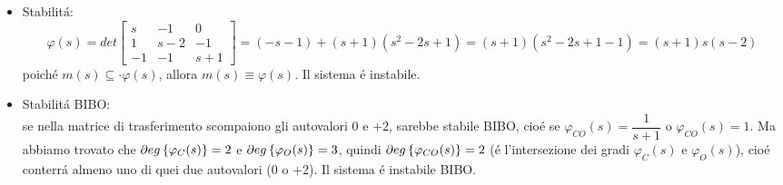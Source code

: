 \documentclass[../main.tex]{subfiles}
\begin{document}
\begin{Exercise}[title={Studiare propriet\'a di sistemi interconnessi}, difficulty=3]
\begin{enumerate}
\begin{itemize}
								Calcoliamo completamente $ Q $ per studiare l'osservabilit\'a da ogni singola uscita:
								\[
									Q=
									\begin{bmatrix}
										1 & 1 & 0\\
										0 & 1 & 0\\
										0 & 0 & 1\\
										\cline{1-3}\\
										-1 & 3 & 1\\
										-1 & 2 & 1\\
										1 & 1 & -1\\
										\cline{1-3}\\
										-2 & 6 & 2\\
										-1 & 4 & 1\\
										-2 & 2 & 2
									\end{bmatrix}
								\]
								Le prime righe di ogni sottomatrice non sono linearmente indipendenti, quindi il sistema non \'e completamente osservabile da $ y_1 $.\\
								Le seconde righe di ogni sottomatrice non sono linearmente indipendenti, quindi il sistema non \'e completamente osservabile da $ y_2 $.\\
								Le terze righe di ogni sottomatrice sono linearmente indipendenti(bisogna calcolare tutti i minori), quindi il sistema non \'e completamente osservabile da $ y_3 $.\\
							\item Stabilit\'a:
								\[
									\varphi(s) = det
									\begin{bmatrix}
										s & -1 & 0\\
										1 & s-2 & -1\\
										-1 & -1 & s+1
									\end{bmatrix} =
									(-s-1)+(s+1)(s^2-2s+1) = (s+1)(s^2-2s+1-1) =(s+1)s(s-2)
								\]
								poich\'e $ m(s) \subseteq\cdot \varphi(s) $, allora $ m(s) \equiv \varphi(s) $. Il sistema \'e instabile.
							\item Stabilit\'a BIBO:\\
								se nella matrice di trasferimento scompaiono gli autovalori $ 0 $ e $ +2 $, sarebbe stabile BIBO, cio\'e se $ \varphi_{CO}(s) = \dfrac{1}{s+1} $ o $ \varphi_{CO}(s) = 1 $. Ma abbiamo trovato che $ \partial eg \left\lbrace \varphi_C(s) \right\rbrace = 2 $ e $ \partial eg \left\lbrace \varphi_{O}(s) \right\rbrace = 3 $, quindi $ \partial eg \left\lbrace \varphi_{CO}(s) \right\rbrace = 2 $ (\'e l'intersezione dei gradi $ \varphi_C(s) $ e $ \varphi_O(s) $), cio\'e conterr\'a almeno uno di quei due autovalori ($ 0 $ o $ +2 $). Il sistema \'e instabile BIBO.
						\end{itemize}
				\end{enumerate}
			\end{Exercise}
		
\end{document}

